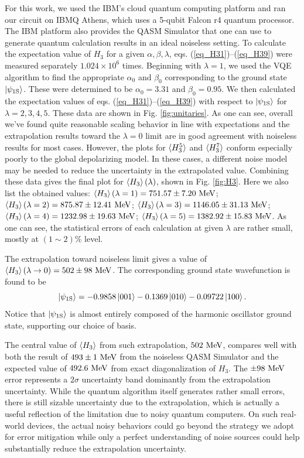\documentclass[aps,10pt,superscriptaddress,floatfix,nofootinbib,notitlepage]{revtex4-1}
\begin{document}
For this work, we used the IBM's cloud quantum computing platform and   ran our circuit on IBMQ Athens, which uses a 5-qubit Falcon r4 quantum processor. The IBM platform also provides the QASM Simulator that one can use to generate quantum calculation results in an ideal noiseless setting. To calculate the expectation value of $H_3$ for a given $\alpha,\beta,\lambda$, eqs. (\ref{eq_H31})--(\ref{eq_H39}) were measured separately $1.024\times10^6$ times. Beginning with $\lambda=1$, we used the VQE algorithm to find the appropriate $\alpha_0$ and $\beta_0$ corresponding to the ground state $\ket{\psi_\text{1S}}$. These were determined to be $\alpha_0=3.31$ and $\beta_0=0.95$. We then calculated the expectation values of eqs. (\ref{eq_H31})--(\ref{eq_H39}) with respect to $\ket{\psi_\text{1S}}$ for $\lambda=2,3,4,5$. These data are shown in Fig. \ref{fig:unitaries}. As one can see, overall we've found quite reasonable scaling behavior in line with expectations and the extrapolation results toward the $\lambda=0$ limit are in good agreement with noiseless results for most cases. However, the plots for $\braket{H_3^5}$ and $\braket{H_3^7}$ conform especially poorly to the global depolarizing model. In these cases, a different noise model may be needed to reduce the uncertainty in the extrapolated value. Combining these data gives the final plot for $\braket{H_3}(\lambda)$, shown in Fig. \ref{fig:H3}. Here we also list the obtained  values:  
$\braket{H_3}(\lambda=1) = 751.57 \pm 7.20 \ \rm MeV $; 
$\braket{H_3}(\lambda=2) = 875.87 \pm 12.41 \ \rm MeV $; 
$\braket{H_3}(\lambda=3) = 1146.05 \pm 31.13 \ \rm MeV $; 
$\braket{H_3}(\lambda=4) = 1232.98 \pm 19.63 \ \rm MeV $; 
$\braket{H_3}(\lambda=5) = 1382.92 \pm 15.83 \ \rm MeV $.
As one can see, the statistical errors of each calculation at given $\lambda$ are rather small, mostly at $(1\sim 2)\%$ level.


 The extrapolation toward noiseless limit gives a value of $\braket{H_3}(\lambda \to 0) = 502\pm98 \ \rm MeV$. The corresponding ground state wavefunction is found to be
\begin{equation}
    \ket{\psi_\text{1S}}
    =-0.9858\ket{001}
    -0.1369\ket{010}
    -0.09722\ket{100}.
\end{equation}
Notice that $\ket{\psi_\text{1S}}$ is almost entirely composed of the harmonic oscillator ground state, supporting our choice of basis.

The central value of $\braket{H_3}$ from such extrapolation, $502\ \rm MeV$, compares well with both the result of $493\pm1 \ \rm MeV$ from the  noiseless QASM Simulator and the expected value of $492.6 \ \rm MeV$ from exact  diagonalization of $H_3$. 
 The $\pm 98 \ \rm MeV$ error   represents a $2\sigma$ uncertainty band dominantly from the extrapolation uncertainty.  While   the quantum algorithm itself generates rather small errors, there is still   sizable uncertainty due to the extrapolation, which is actually a useful reflection of the limitation due to noisy quantum computers. On such real-world devices, the actual noisy behaviors could go beyond the strategy we adopt for error mitigation  while only a perfect understanding of noise sources could help substantially reduce the extrapolation uncertainty.
 
\end{document}
